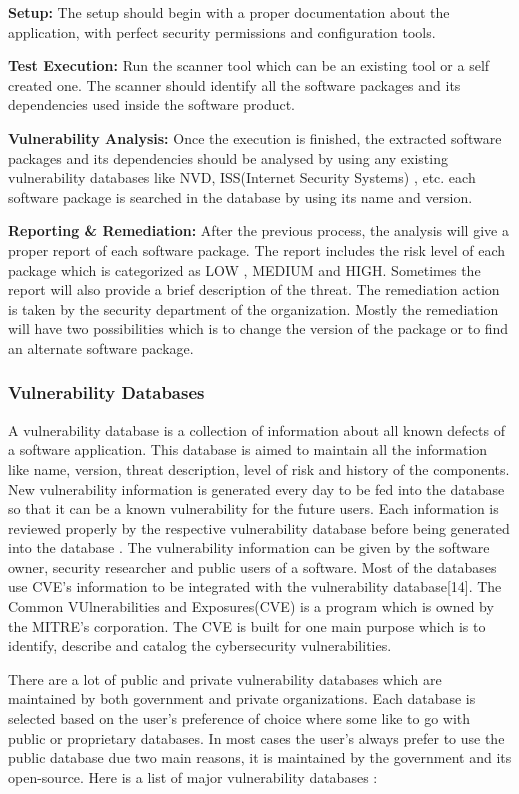 	\textbf{Setup:} The setup should begin with a proper documentation about the application, with perfect security permissions and configuration tools.
	
	\textbf{Test Execution:} Run the scanner tool which can be an existing tool or a self created one. The scanner should identify all the software packages and its dependencies used inside the software product.
	
	\textbf{Vulnerability Analysis:} Once the execution is finished, the extracted software packages and its dependencies should be analysed by using any existing vulnerability databases like \acs{NVD}, ISS(Internet Security Systems) , etc. each software package is searched in the database by using its name and version.
	
	\textbf{Reporting \& Remediation:} After the previous process, the analysis will give a proper report of each software package. The report includes the risk level of each package which is categorized as LOW , MEDIUM and  HIGH. Sometimes the report will also provide a brief description of the threat. The remediation action is taken by the security department of the organization. Mostly the remediation will have two possibilities which is to change the version of the package or to find an alternate software package.

\subsubsection{Vulnerability Databases}
A vulnerability database is a collection of information about all known defects of a software application. This database is aimed to maintain all the information like name, version, threat description, level of risk and history of the components. New vulnerability information is generated every day to be fed into the database so that it can be a known vulnerability for the future users. Each information is reviewed properly by the respective vulnerability database before being generated into the database \cite{Va2017}. The vulnerability information can be given by the software owner, security researcher and public users of a software. Most of the databases use \acs{CVE}’s information to be integrated with the vulnerability database[14]. The Common VUlnerabilities and Exposures(\acs{CVE}) is a program which is owned by the MITRE’s corporation. The \acs{CVE} is built for one main purpose which is to identify, describe and catalog the cybersecurity vulnerabilities.

There are a lot of public and private vulnerability databases which are maintained by both government and private organizations. Each database is selected based on the user's preference of choice where some like to go with public or proprietary databases. In most cases the user’s always prefer to use the public database due two main reasons, it is maintained by the government and its open-source. Here is a list of major vulnerability databases \cite{LoAc2011}:

